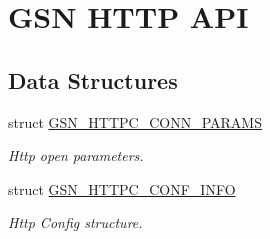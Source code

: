 \hypertarget{a00665}{
\section{GSN HTTP API}
\label{a00665}
}
\subsection*{Data Structures}
\begin{DoxyCompactItemize}
\item 
struct \hyperlink{a00094}{GSN\_\-HTTPC\_\-CONN\_\-PARAMS}
\begin{DoxyCompactList}\small\item\em Http open parameters. \end{DoxyCompactList}\item 
struct \hyperlink{a00093}{GSN\_\-HTTPC\_\-CONF\_\-INFO}
\begin{DoxyCompactList}\small\item\em Http Config structure. \end{DoxyCompactList}\end{DoxyCompactItemize}
